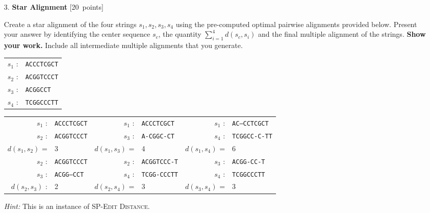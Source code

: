 \begin{enumerate}
\clearpage
\item[3.] \textbf{Star Alignment} [20~points]

Create a star alignment of the four strings $s_1,s_2,s_3,s_4$ using the pre-computed optimal pairwise alignments provided below. Present your answer by identifying the center sequence $s_c$, the quantity $\sum_{i=1}^4 d(s_c,s_i)$ and the final multiple alignment of the strings.
\textbf{Show your work.} Include all intermediate multiple alignments that you generate.

\begin{tabular}{ll}
$s_1$ : & \texttt{ACCCTCGCT}\\
$s_2$ : & \texttt{ACGGTCCCT}\\
$s_3$ : & \texttt{ACGGCCT}\\
$s_4$ : & \texttt{TCGGCCCTT}
\end{tabular}

\begin{tabular}{|rl|rl|rl|}
\hline
$s_1$ : & \texttt{ACCCTCGCT} & $s_1$ : & \texttt{ACCCTCGCT} & $s_1$ : & \texttt{AC--CCTCGCT}\\
$s_2$ : & \texttt{ACGGTCCCT} & $s_3$ : & \texttt{A-CGGC-CT} & $s_4$ : & \texttt{TCGGCC-C-TT}\\
$d(s_1,s_2)$ = & 3 & $d(s_1,s_3)$ = & 4 & $d(s_1,s_4)$ = & 6\\
\hline
$s_2$ : & \texttt{ACGGTCCCT} & $s_2$ : & \texttt{ACGGTCCC-T} & $s_3$ : & \texttt{ACGG-CC-T}\\
$s_3$ : & \texttt{ACGG--CCT} & $s_4$ : & \texttt{TCGG-CCCTT} & $s_4$ : & \texttt{TCGGCCCTT}\\
$d(s_2,s_3)$ : & 2 & $d(s_2,s_4)$ = & 3 & $d(s_3,s_4)$ = & 3\\
\hline
\end{tabular}

\emph{Hint:} This is an instance of \textsc{SP-Edit Distance}.

\end{enumerate}
